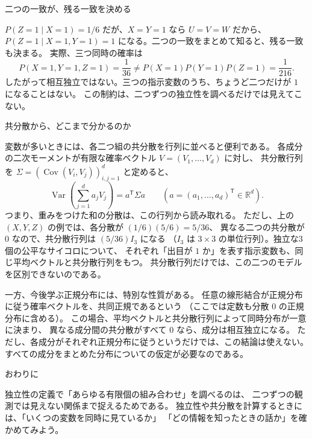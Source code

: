 \documentclass[a4paper,10pt,pdflatex,ja=standard,jafont=ipaex-type1,
  magstyle=real,scale=1]{bxjsarticle}
\newcommand{\columnheading}[1]{\par\vspace{5pt}
  {\fontsize{11pt}{15pt}\selectfont\sffamily\mdseries\color{accent}#1}\par\vspace{2pt}}
\newcommand{\R}{\mathbb R}
\newcommand{\Var}{\operatorname{Var}}
\newcommand{\Cov}{\operatorname{Cov}}
\begin{document}
\columnheading{二つの一致が、残る一致を決める}
$P(Z=1\mid X=1)=1/6$ だが、$X=Y=1$ なら $U=V=W$ だから、
$P(Z=1\mid X=1,Y=1)=1$ になる。二つの一致をまとめて知ると、残る一致も決まる。
実際、三つ同時の確率は
$$
  P(X=1,Y=1,Z=1)=\frac1{36}
  \ne P(X=1)P(Y=1)P(Z=1)=\frac1{216}.
$$
したがって相互独立ではない。三つの指示変数のうち、ちょうど二つだけが $1$ になることはない。
この制約は、二つずつの独立性を調べるだけでは見えてこない。

\columnheading{共分散から、どこまで分かるのか}
変数が多いときには、各二つ組の共分散を行列に並べると便利である。
各成分の二次モーメントが有限な確率ベクトル $V=(V_1,\ldots,V_d)$ に対し、
共分散行列を $\Sigma=(\Cov(V_i,V_j))_{i,j=1}^d$ と定めると、
$$
  \Var\left(\sum_{j=1}^d a_jV_j\right)=a^{\mathsf T}\Sigma a
  \qquad(a=(a_1,\ldots,a_d)^{\mathsf T}\in\R^d).
$$
つまり、重みをつけた和の分散は、この行列から読み取れる。
ただし、上の $(X,Y,Z)$ の例では、各分散が $(1/6)(5/6)=5/36$、
異なる二つの共分散が $0$ なので、共分散行列は $(5/36)I_3$ になる
（$I_3$ は $3\times3$ の単位行列）。独立な3個の公平なサイコロについて、
それぞれ「出目が $1$ か」を表す指示変数も、同じ平均ベクトルと共分散行列をもつ。
共分散行列だけでは、この二つのモデルを区別できないのである。

一方、今後学ぶ正規分布には、特別な性質がある。
任意の線形結合が正規分布に従う確率ベクトルを、共同正規であるという
（ここでは定数も分散 $0$ の正規分布に含める）。
この場合、平均ベクトルと共分散行列によって同時分布が一意に決まり、
異なる成分間の共分散がすべて $0$ なら、成分は相互独立になる。
ただし、各成分がそれぞれ正規分布に従うというだけでは、この結論は使えない。
すべての成分をまとめた分布についての仮定が必要なのである。

\columnheading{おわりに}
独立性の定義で「あらゆる有限個の組み合わせ」を調べるのは、
二つずつの観測では見えない関係まで捉えるためである。
独立性や共分散を計算するときには、「いくつの変数を同時に見ているか」
「どの情報を知ったときの話か」を確かめてみよう。

\label{lastpage}
\clearpage
\endgroup
\end{document}
